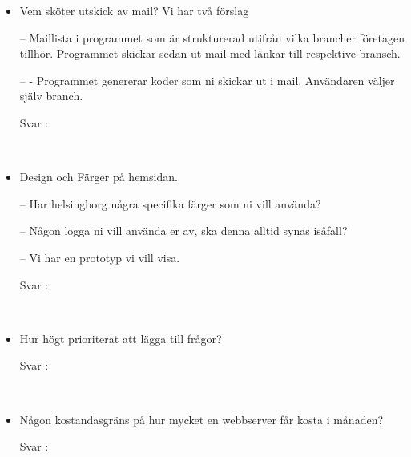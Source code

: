 \documentclass{article}
\begin{document}
\begin{itemize}
\begin{description}
        \end{description}
    \\
    \item Vem sköter utskick av mail? Vi har två förslag
    \item[--] Maillista i programmet som är strukturerad utifrån vilka brancher företagen tillhör. Programmet skickar sedan ut mail med länkar till respektive bransch.
    \item[--] - Programmet genererar koder som ni skickar ut i mail. Användaren väljer själv branch.
        \begin{description}
            \item[Svar :]
        \end{description}
    \\
    \item Design och Färger på hemsidan.
    \item[--]Har helsingborg några specifika färger som ni vill använda?
    \item[-- ]Någon logga ni vill använda er av, ska denna alltid synas isåfall?
    \item[--] Vi har en prototyp vi vill visa.
        \begin{description}
            \item[Svar :]
        \end{description}
    \\
    \item Hur högt prioriterat att lägga till frågor?
        \begin{description}
            \item[Svar :]
        \end{description}
    \\
    \item Någon kostandasgräns på hur mycket en webbserver får kosta i månaden?
        \begin{description}
            \item[Svar :]
        \end{description}
    \\
\end{itemize}
\end{document}
